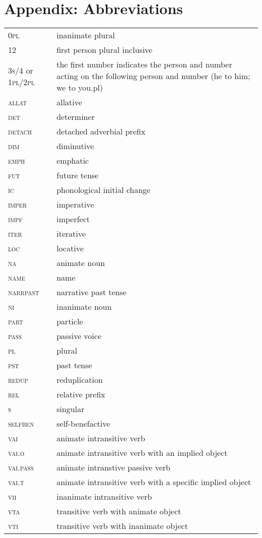 \documentclass[11pt]{article}
\begin{document}
\section*{Appendix: Abbreviations}
\begin{table}[!ht]
\centering \small
\begin{tabular}{l p{2.3in}}
\textsc{0pl} & inanimate plural\\
12 & first person plural inclusive\\
\textsc{3s/4} or \textsc{1pl/2pl} & the first number indicates the person and number acting on the following person and number (he to him; we to you.pl)\\
\textsc{allat} & allative\\
\textsc{det} & determiner\\
\textsc{detach} &	detached adverbial prefix\\
\textsc{dim} &	diminutive\\
\textsc{emph} & emphatic\\
\textsc{fut} &	future tense\\
\textsc{ic} &	phonological initial change\\
\textsc{imper} & imperative\\
\textsc{impf} &	imperfect\\
\textsc{iter} & iterative\\
\textsc{loc} &	locative\\
\textsc{na} &	animate noun\\
\textsc{name} &	name\\
\textsc{narrpast} &	narrative past tense\\
\textsc{ni} &	inanimate noun\\
\textsc{part} &	particle\\
\textsc{pass} &	passive voice\\
\textsc{pl} &	plural\\
\textsc{pst} &	past tense\\
\textsc{redup} &	reduplication\\
\textsc{rel} &	relative prefix\\
\textsc{s} &	singular\\
\textsc{selfben} &	self-benefactive\\
\textsc{vai} &	animate intransitive verb\\
\textsc{vai.o} &	animate intransitive verb with an implied object\\
\textsc{vai.pass} &	animate intranstive passive verb\\
\textsc{vai.t} &	animate intransitive verb with a specific implied object\\
\textsc{vii} &	inanimate intransitive verb\\
\textsc{vta} &	transitive verb with animate object\\
\textsc{vti} &	transitive verb with inanimate object\\
\end{tabular}
\end{table}
\normalsize
\end{document}
